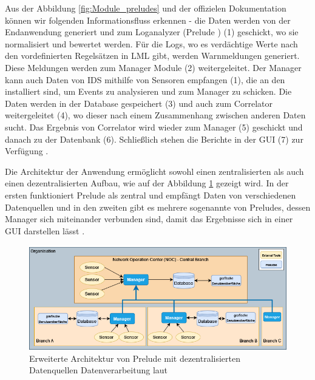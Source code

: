 Aus der Abbildung \ref{fig:Module_preludes} und der offizielen Dokumentation können wir folgenden Informationsfluss erkennen - die Daten werden von der Endanwendung generiert und zum Loganalyzer (Prelude ) (1) geschickt, wo sie normalisiert und bewertet werden. Für die Logs, wo es verdächtige Werte nach den vordefinierten Regelsätzen in \gls{LML} gibt, werden Warnmeldungen generiert. Diese Meldungen werden zum Manager Module (2) weitergeleitet. Der Manager kann auch Daten von \gls{IDS} mithilfe von Sensoren empfangen (1), die an den  installiert sind, um Events zu analysieren und zum Manager zu schicken. Die Daten werden in der Database gespeichert (3) und auch zum Correlator weitergeleitet (4), wo dieser nach einem Zusammenhang zwischen anderen Daten sucht. Das Ergebnis von Correlator wird wieder zum Manager (5) geschickt und danach zu der Datenbank (6). Schließlich stehen die Berichte in der \gls{GUI} (7) zur Verfügung \citep{Prelude_Doc}.

Die Architektur der Anwendung ermöglicht sowohl einen zentralisierten als auch einen dezentralisierten Aufbau, wie auf der Abbildung \ref{fig:Prelude_erweitert} gezeigt wird. In der ersten funktioniert Prelude als zentral und empfängt Daten von verschiedenen Datenquellen und in den zweiten gibt es mehrere sogenannte  von Preludes, dessen Manager sich miteinander verbunden sind, damit das Ergebnisse sich in einer \gls{GUI} darstellen lässt \citep{Prelude_MU}.

\begin{figure}[H]
   \centering
   \includegraphics[width=1\textwidth]{assets/Branch_Prelude.drawio.png}
   \caption[Erweiterte Architektur von Prelude mit dezentralisierten Datenquellen und Datenverarbeitung]
   {Erweiterte Architektur von Prelude mit dezentralisierten Datenquellen Datenverarbeitung laut \cite{Prelude_MU}}
   \label{fig:Prelude_erweitert}
   \centering
\end{figure}

